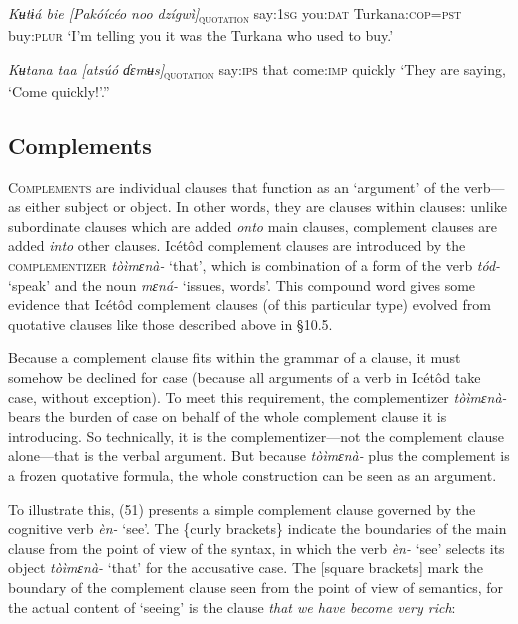 \begin{table}
\textit{Kʉtɨá     bie   [Pakóícéo noo   dzígwì]}\textsc{\textsubscript{quotation}}
say:\textsc{1sg}   you:\textsc{dat} Turkana:\textsc{cop=pst} buy:\textsc{plur}
‘I’m telling you it was the Turkana who used to buy.’




\textit{Kʉtana   taa   [atsúó   ɗɛmʉs]}\textsc{\textsubscript{quotation }}
say:\textsc{ips}  that   come:\textsc{imp}   quickly
‘They are saying, ‘Come quickly!’.”






\subsection{Complements}


\textsc{Complements }are individual clauses that function as an ‘argument’\textsc{ }of the verb—as either subject or object. In other words, they are clauses within clauses: unlike subordinate clauses which are added \textit{onto} main clauses, complement clauses are added \textit{into} other clauses. Icétôd complement clauses are introduced by the \textsc{complementizer} \textit{tòìmɛnà-} ‘that’, which is combination of a form of the verb \textit{tód- }‘speak’ and the noun \textit{mɛná- }‘issues, words’. This compound word gives some evidence that Icétôd complement clauses (of this particular type) evolved from quotative clauses like those described above in §10.5.

Because a complement clause fits within the grammar of a clause, it must somehow be declined for case (because all arguments of a verb in Icétôd take case, without exception). To meet this requirement, the complementizer \textit{tòìmɛnà-} bears the burden of case on behalf of the whole complement clause it is introducing. So technically, it is the complementizer—not the complement clause alone—that is the verbal argument. But because \textit{tòìmɛnà- }plus the complement is a frozen quotative formula, the whole construction can be seen as an argument.

To illustrate this, (51) presents a simple complement clause governed by the cognitive verb \textit{èn- }‘see’. The \{curly brackets\} indicate the boundaries of the main clause from the point of view of the syntax, in which the verb \textit{èn- }‘see’ selects its object \textit{tòìmɛnà- }‘that’ for the accusative case. The [square brackets] mark the boundary of the complement clause seen from the point of view of semantics, for the actual content of ‘seeing’ is the clause \textit{that we have become very rich}:





\end{table}
